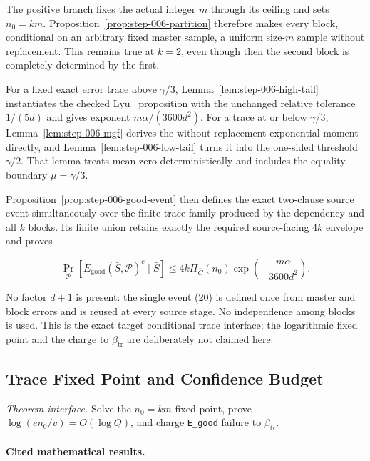 The positive branch fixes the actual integer \(m\) through its ceiling and
sets \(n_0=km\).  Proposition~\ref{prop:step-006-partition} therefore makes
every block, conditional on an arbitrary fixed master sample, a uniform
size-\(m\) sample without replacement.  This remains true at \(k=2\), even
though then the second block is completely determined by the first.

For a fixed exact error trace above \(\gamma/3\),
Lemma~\ref{lem:step-006-high-tail} instantiates the checked Lyu~\citep{lyu2025} proposition
with the unchanged relative tolerance \(1/(5d)\) and gives exponent
\(m\alpha/(3600d^2)\).  For a trace at or below \(\gamma/3\),
Lemma~\ref{lem:step-006-mgf} derives the without-replacement exponential
moment directly, and Lemma~\ref{lem:step-006-low-tail} turns it into the
one-sided threshold \(\gamma/2\).  That lemma treats mean zero
deterministically and includes the equality boundary \(\mu=\gamma/3\).

Proposition~\ref{prop:step-006-good-event} then defines the exact two-clause
source event simultaneously over the finite trace family produced by the
 dependency and all \(k\) blocks.  Its finite union retains exactly
the required source-facing \(4k\) envelope and proves

\[
 \Pr_{\mathcal P}
 [E_{\mathrm{good}}(\bar S,\mathcal P)^c\mid\bar S]
 \leq4k\Pi_{\bar C}(n_0)
 \exp\!\left(-\frac{m\alpha}{3600d^2}\right).
\tag{26}
\]

No factor \(d+1\) is present: the single event (20) is defined once from
master and block errors and is reused at every source stage.  No
independence among blocks is used.  This is the exact target conditional
trace interface; the logarithmic fixed point and the charge to
\(\beta_{\mathrm{tr}}\) are deliberately not claimed here.



\subsection{Trace Fixed Point and Confidence Budget}\label{app:step_007}

\noindent\textit{Theorem interface.} Solve the \(n_0=km\) fixed point, prove   \(\log(en_0/v)=O(\log Q)\), and charge \texttt{E\_good} failure to   \(\beta_{\mathrm{tr}}\).

\paragraph{Cited mathematical results.}


